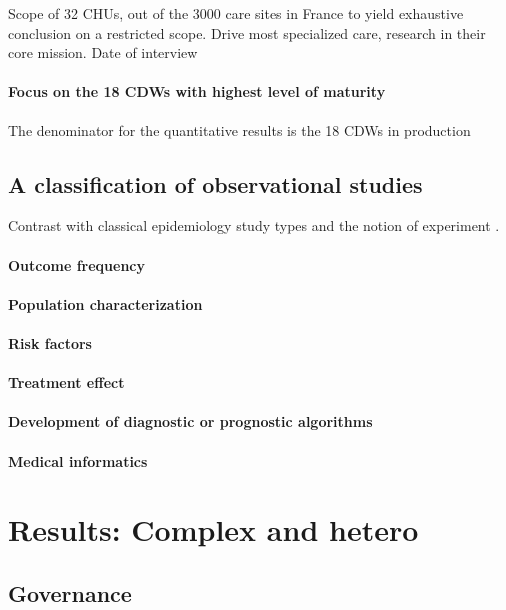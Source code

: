 \documentclass{report}
\begin{document}
Scope of 32 CHUs, out of the 3000 care sites in France to yield exhaustive
conclusion on a restricted scope. Drive most specialized care, research in their
core mission. Date of interview

\paragraph{Focus on the 18 CDWs with highest level of maturity}

The denominator for the quantitative results is the 18 CDWs in production

\subsection{A classification of observational studies}\label{subsec:cdw:classification}

Contrast with classical epidemiology study types and the notion of experiment \citep{rothman2012epidemiology}.

\paragraph{Outcome frequency}
\paragraph{Population characterization}
\paragraph{Risk factors}
\paragraph{Treatment effect}
\paragraph{Development of diagnostic or prognostic algorithms}
\paragraph{Medical informatics}


\section{Results: Complex and hetero}\label{sec:cdw:results}

\subsection{Governance}\label{subsec:cdw:results:governance}
\end{document}
